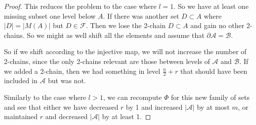 \documentclass[12pt]{article}
\theoremstyle{plain}
\theoremstyle{definition}
\theoremstyle{remark}
\newcommand{\F}{\mathcal{F}}
\newcommand{\A}{\mathcal{A}}
\newcommand{\B}{\mathcal{B}}
\begin{document}
\begin{proof}
This reduces the problem to the case where $l=1$. So we have at least one missing subset one level below $A$. If there was another set $D \subset A$ where $|D| = |M(A)|$ but $D \in \F$. Then we lose the 2-chain $D \subset A$ and gain no other 2-chains. So we might as well shift all the elements and assume that $\partial \A = \B$. 

So if we shift according to the injective map, we will not increase the number of 2-chains, since the only 2-chains relevant are those between levels of $\A$ and $\B$. If we added a 2-chain, then we had something in level $\frac{n}{2} + r$ that should have been included in $\A$ but was not.

Similarly to the case where $l>1$, we can recompute $\Phi$ for this new family of sets and see that either we have decreased $r$ by 1 and increased $|\A|$ by at most $m$, or maintained $r$ and decreased $|\A|$ by at least 1. 

\end{proof}
\end{document}
